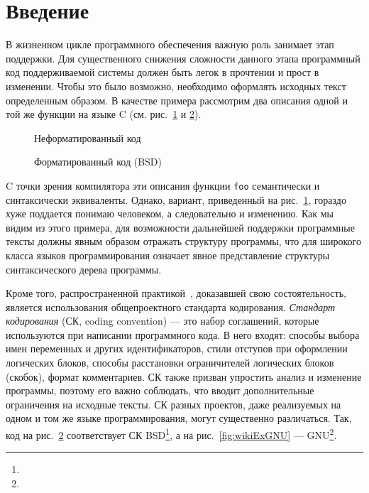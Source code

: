 \section*{Введение}

В жизненном цикле программного обеспечения важную роль занимает этап
поддержки\cite{maintance}. Для существенного снижения сложности данного этапа
программный код поддерживаемой системы должен быть легок в прочтении и прост
в изменении. Чтобы это было возможно, необходимо оформлять исходных текст
определенным образом.
В качестве примера рассмотрим два описания одной и той же функции на языке C
(см. рис.~\ref{fig:wikiExUnfor} и \ref{fig:wikiExBSD}).

\begin{figure}[h!]
	\centering
	
	\caption{Неформатированный код}
	\label{fig:wikiExUnfor}
\end{figure}

\begin{figure}[h!]
	\centering
	
  \caption{Форматированный код (BSD)}
	\label{fig:wikiExBSD}
\end{figure}

C точки зрения компилятора
эти описания функции \lstinline[language = Java]{foo}
семантически и синтаксически эквиваленты.
Однако, вариант, приведенный на
рис.~\ref{fig:wikiExUnfor}, гораздо хуже
поддается понимаю человеком, а следовательно и изменению.
Как мы видим из этого примера, для возможности дальнейшей поддержки
программные тексты должны явным образом
отражать структуру программы, что для широкого класса языков
программирования означает явное представление структуры синтаксического
дерева программы.

Кроме того, распространенной практикой~\cite{codingStandarts},
доказавшей свою состоятельность, является использования
общепроектного стандарта кодирования.
\emph{Стандарт кодирования} (СК, coding convention) ---
это набор соглашений, которые используются
при написании программного кода. В него входят: способы выбора имен переменных
и других идентификаторов, стили отступов при оформлении логических блоков,
способы расстановки ограничителей логических блоков (скобок),
формат комментариев. СК также призван упростить анализ и изменение
программы, поэтому его важно соблюдать, что вводит
дополнительные ограничения на исходные тексты. СК разных проектов, даже
реализуемых на одном и том же языке программирования, могут существенно
различаться.
Так, код на рис.~\ref{fig:wikiExBSD} соответствует СК
BSD\footnote{},
а на рис.~\ref{fig:wikiExGNU} ---
GNU\footnote{}.

